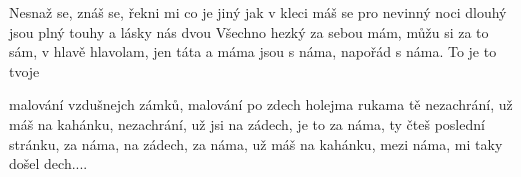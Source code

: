 \resetVars%
%
%
\MakeHeader%
\Lyrics%

Nesnaž se, znáš se,
řekni mi co je jiný
jak v kleci máš se
pro nevinný
noci dlouhý jsou plný touhy
a lásky nás dvou
Všechno hezký za sebou mám,
můžu si za to sám,
v hlavě hlavolam,
jen táta a máma jsou s náma,
napořád s náma. To je to tvoje

malování vzdušnejch zámků,
malování po zdech holejma rukama tě
nezachrání, už máš na kahánku,
nezachrání, už jsi na zádech,
je to za náma, ty čteš poslední stránku,
za náma, na zádech,
za náma, už máš na kahánku,
mezi náma, mi taky došel dech....

\Next
